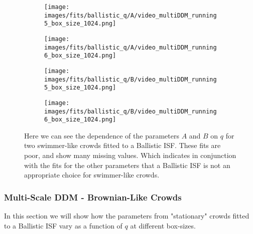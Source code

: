 \documentclass[10pt]{article}
\begin{document}
\begin{figure}[H]
\begin{subfigure}[t]{.5\textwidth}
  \centering
  \texttt{[image: images/fits/ballistic\_q/A/video\_multiDDM\_running5\_box\_size\_1024.png]}
  \caption{}
\end{subfigure}%
\hfill
\begin{subfigure}[t]{.5\textwidth}
  \centering
  \texttt{[image: images/fits/ballistic\_q/A/video\_multiDDM\_running6\_box\_size\_1024.png]}
  \caption{}
\end{subfigure}
\label{fig:running_ballistic_fits_A}
\par\bigskip
\begin{subfigure}[t]{.5\textwidth}
  \centering
  \texttt{[image: images/fits/ballistic\_q/B/video\_multiDDM\_running5\_box\_size\_1024.png]}
  \caption{}
\end{subfigure}%
\hfill
\begin{subfigure}[t]{.5\textwidth}
  \centering
  \texttt{[image: images/fits/ballistic\_q/B/video\_multiDDM\_running6\_box\_size\_1024.png]}
  \caption{}
\end{subfigure}
\caption{Here we can see the dependence of the parameters $A$ and $B$ on $q$ for two swimmer-like crowds fitted to a Ballistic ISF. These fits are poor, and show many missing values. Which indicates in conjunction with the fits for the other parameters that a Ballistic ISF is not an appropriate choice for swimmer-like crowds.}
\label{fig:running_ballistic_fits_B}
\end{figure}

\subsubsection{Multi-Scale DDM - Brownian-Like Crowds}
In this section we will show how the parameters from "stationary" crowds fitted to a Ballistic ISF vary as a function of $q$ at different box-sizes. 
\end{document}
